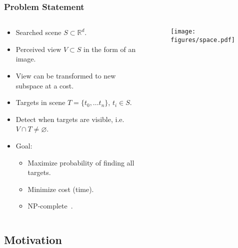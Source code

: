 \begin{frame}
    \frametitle{Problem Statement}

    \begin{columns}
        \begin{column}{0.6\textwidth}
            \begin{itemize}
                \item Searched scene \(S \subset \mathbb{R}^d\).
                \item Perceived view \(V \subset S\) in the form of an image.
                \item View can be transformed to new subspace at a cost.
                \item Targets in scene \(T = \{t_0, \dots t_n\}\), \(t_i \in S\).
                \item Detect when targets are visible, i.e. \(V \cap T \neq \varnothing\). 
                \item Goal:
                \begin{itemize}
                    \item Maximize probability of finding all targets.
                    \item Minimize cost (time).
                    \item NP-complete~\cite{andreopoulos_theory_2009}. %
                \end{itemize}
            \end{itemize}
        \end{column}
        \begin{column}{0.4\textwidth}
            \begin{figure}
                \centering
                \texttt{[image: figures/space.pdf]}
            \end{figure}
        \end{column}
    \end{columns}   


\end{frame}

\subsection{Motivation}

